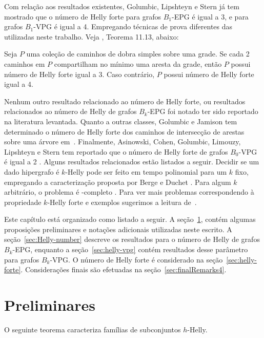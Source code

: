 Com relação aos resultados existentes, 
Golumbic, Lipshteyn  e Stern \cite{golumbic2009} já tem mostrado que o número de Helly forte para grafos $B_1$-EPG é igual a 3, e para grafos $B_1$-VPG é igual a  4. Empregando técnicas de prova diferentes das utilizadas neste trabalho. Veja  \cite{golumbic2019edge}, Teorema 11.13, abaixo:
\begin{theorem}\label{thm:golumbic2019edge}{\cite{golumbic2019edge}}
Seja $P$ uma coleção de caminhos de dobra simples sobre uma grade. Se cada 2 caminhos em  $P$ compartilham no mínimo uma aresta da grade, então $P$ possui número de Helly forte igual a 3. Caso contrário, $P$ possui número de Helly forte igual a 4. 
\end{theorem}
Nenhum outro resultado relacionado ao número de Helly forte, ou resultados relacionados ao número de Helly de grafos $B_k$-EPG foi notado ter sido reportado na literatura levantada. Quanto a outras classes, Golumbic e Jamison  tem determinado o número de Helly forte dos caminhos de intersecção de arestas sobre uma árvore em~\cite{golumbic1985}. Finalmente, Asinowski, Cohen, Golumbic, Limouzy, Lipshteyn e Stern tem reportado que o número de Helly forte de grafos $B_0$-VPG é igual a 2 \cite{asinowski2011string}.  
Alguns resultados relacionados estão listados a seguir. Decidir se um dado hipergrafo é  $k$-Helly pode ser feito em tempo polinomial para um  $k$ fixo,  empregando a caracterização proposta por Berge e Duchet \cite{bergeDuchet1975}. Para algum $k$ arbitrário, o problema é  -completo \cite{dourado2009}. Para ver mais problemas correspondendo à propriedade $k$-Helly forte e exemplos sugerimos a leitura de~\cite{dourado2008strong,dourado2009}.

Este capítulo está organizado como listado a seguir. A seção~\ref{sec:preliminares4}, contém algumas proposições preliminares e notações adicionais utilizadas neste escrito. A seção~\ref{sec:Helly-number}  descreve os resultados para o número de Helly de grafos $B_k$-EPG, enquanto a seção~\ref{sec:helly-vpg} contém resultados desse parâmetro para grafos $B_k$-VPG. O número de Helly forte é considerado na seção~\ref{sec:helly-forte}. Considerações finais são efetuadas na seção~\ref{sec:finalRemarks4}.

\section{Preliminares}\label{sec:preliminares4}

O seguinte teorema caracteriza famílias de subconjuntos $h$-Helly.


